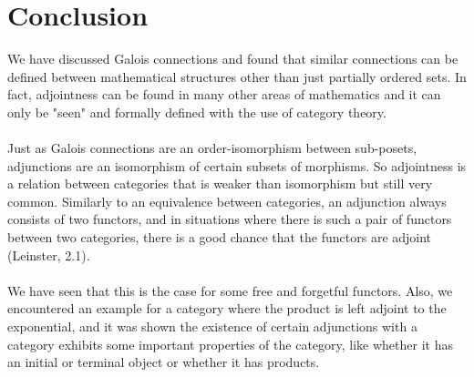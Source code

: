 \section*{Conclusion}
	We have discussed Galois connections and found that similar connections can be defined between mathematical structures other than just partially ordered sets. In fact, adjointness can be found in many other areas of mathematics and it can only be "seen" and formally defined with the use of category theory. \\\\
	Just as Galois connections are an order-isomorphism between sub-posets, adjunctions are an isomorphism of certain subsets of morphisms. So adjointness is a relation between categories that is weaker than isomorphism but still very common. Similarly to an equivalence between categories, an adjunction always consists of two functors, and in situations where there is such a pair of functors between two categories, there is a good chance that the functors are adjoint (Leinster, 2.1).
	\\\\ 
	We have seen that this is the case for some free and forgetful functors. Also, we encountered an example for a category where the product is left adjoint to the exponential, and it was shown the existence of certain adjunctions with a category exhibits some important properties of the category, like whether it has an initial or terminal object or whether it has products. 


